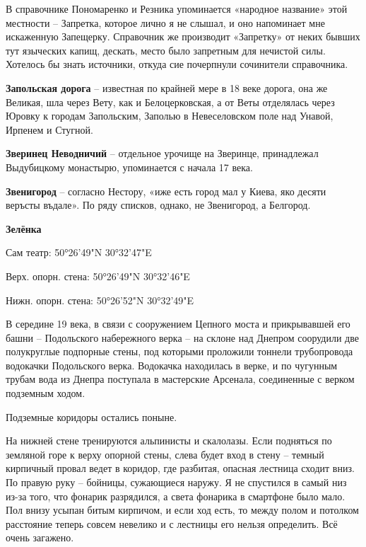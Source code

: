 В справочнике Пономаренко и Резника упоминается «народное название» этой местности – Запретка, которое лично я не слышал, и оно напоминает мне искаженную Запещерку. Справочник же производит «Запретку» от неких бывших тут языческих капищ, дескать, место было запретным для нечистой силы. Хотелось бы знать источники, откуда сие почерпнули сочинители справочника.\\

\medskip

\textbf{Запольская дорога} – известная по крайней мере в 18 веке дорога, она же Великая, шла через Вету, как и Белоцерковская, а от Веты отделялась через Юровку к городам Запольским, Заполью в Невеселовском поле над Унавой, Ирпенем и Стугной.\\

\medskip

\textbf{Зверинец Неводничий} – отдельное урочище на Зверинце, принадлежал Выдубицкому монастырю, упоминается с начала 17 века.\\

\medskip

\textbf{Звенигород} – согласно Нестору, «иже есть город мал у Киева, яко десяти веръсты въдале». По ряду списков, однако, не Звенигород, а Белгород.\\

\medskip

\textbf{Зелёнка}

Сам театр: 50°26'49"N 30°32'47"E

Верх. опорн. стена: 50°26'49"N 30°32'46"E

Нижн. опорн. стена: 50°26'52"N 30°32'49"E

В середине 19 века, в связи с сооружением Цепного моста и прикрывавшей его башни – Подольского набережного верка – на склоне над Днепром соорудили две полукруглые подпорные стены, под которыми проложили тоннели трубопровода водокачки Подольского верка. Водокачка находилась в верке, и по чугунным трубам вода из Днепра поступала в мастерские Арсенала, соединенные с верком подземным ходом. 

Подземные коридоры остались поныне. 

На нижней стене тренируются альпинисты и скалолазы. Если подняться по земляной горе к верху опорной стены, слева будет вход в стену – темный кирпичный провал ведет в коридор, где разбитая, опасная лестница сходит вниз. По правую руку – бойницы, сужающиеся наружу. Я не спустился в самый низ из-за того, что фонарик разрядился, а света фонарика в смартфоне было мало. Пол внизу усыпан битым кирпичом, и если ход есть, то между полом и потолком расстояние теперь совсем невелико и с лестницы его нельзя определить. Всё очень загажено. 


